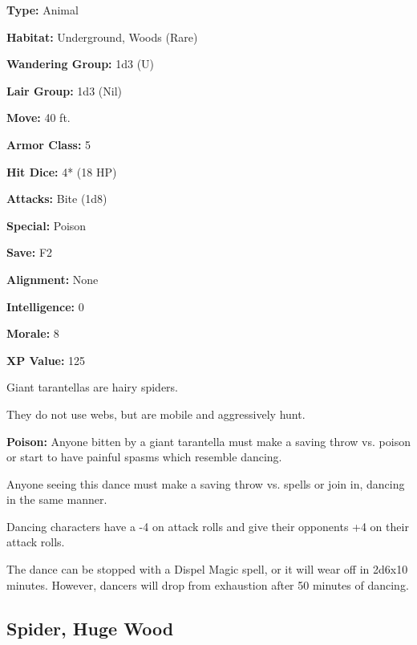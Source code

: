 \begin{multicols*}{2}
{{\textbf{Type:} Animal

\textbf{Habitat:} Underground, Woods (Rare)

\textbf{Wandering Group:} 1d3 (U)

\textbf{Lair Group:} 1d3 (Nil)

\textbf{Move:} 40 ft.

\textbf{Armor Class:} 5

\textbf{Hit Dice:} 4* (18 HP)

\textbf{Attacks:} Bite (1d8)

\textbf{Special:} Poison

\textbf{Save:} F2

\textbf{Alignment:} None

\textbf{Intelligence:} 0

\textbf{Morale:} 8

\textbf{XP Value:} 125}}

Giant tarantellas are hairy spiders.

They do not use webs, but are mobile and aggressively hunt.

\textbf{Poison:} Anyone bitten by a giant tarantella must make a saving throw vs. poison or start to have painful spasms which resemble dancing.

Anyone seeing this dance must make a saving throw vs. spells or join in, dancing in the same manner.

Dancing characters have a -4 on attack rolls and give their opponents +4 on their attack rolls.

The dance can be stopped with a Dispel Magic spell, or it will wear off in 2d6x10 minutes. However, dancers will drop from exhaustion after 50 minutes of dancing.

\subsection{Spider, Huge Wood}\label{Huge Wood Spider}
\end{multicols*}
